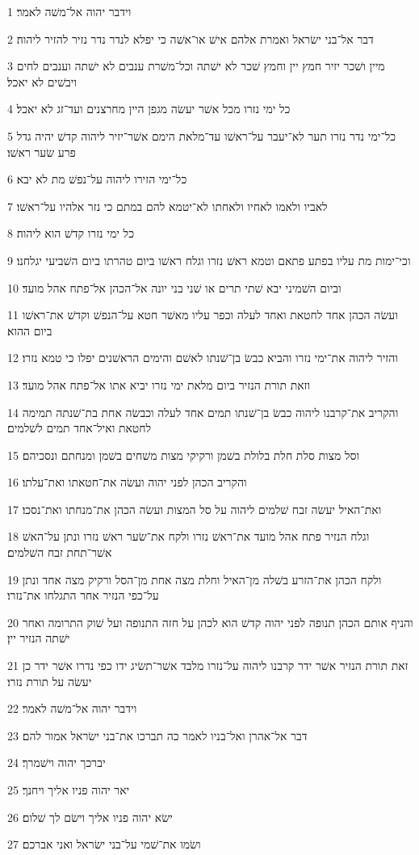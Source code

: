 \par 1 וידבר יהוה אל־משׁה לאמר׃
\par 2 דבר אל־בני ישׂראל ואמרת אלהם אישׁ או־אשׁה כי יפלא לנדר נדר נזיר להזיר ליהוה׃
\par 3 מיין ושׁכר יזיר חמץ יין וחמץ שׁכר לא ישׁתה וכל־משׁרת ענבים לא ישׁתה וענבים לחים ויבשׁים לא יאכל׃
\par 4 כל ימי נזרו מכל אשׁר יעשׂה מגפן היין מחרצנים ועד־זג לא יאכל׃
\par 5 כל־ימי נדר נזרו תער לא־יעבר על־ראשׁו עד־מלאת הימם אשׁר־יזיר ליהוה קדשׁ יהיה גדל פרע שׂער ראשׁו׃
\par 6 כל־ימי הזירו ליהוה על־נפשׁ מת לא יבא׃
\par 7 לאביו ולאמו לאחיו ולאחתו לא־יטמא להם במתם כי נזר אלהיו על־ראשׁו׃
\par 8 כל ימי נזרו קדשׁ הוא ליהוה׃
\par 9 וכי־ימות מת עליו בפתע פתאם וטמא ראשׁ נזרו וגלח ראשׁו ביום טהרתו ביום השׁביעי יגלחנו׃
\par 10 וביום השׁמיני יבא שׁתי תרים או שׁני בני יונה אל־הכהן אל־פתח אהל מועד׃
\par 11 ועשׂה הכהן אחד לחטאת ואחד לעלה וכפר עליו מאשׁר חטא על־הנפשׁ וקדשׁ את־ראשׁו ביום ההוא׃
\par 12 והזיר ליהוה את־ימי נזרו והביא כבשׂ בן־שׁנתו לאשׁם והימים הראשׁנים יפלו כי טמא נזרו׃
\par 13 וזאת תורת הנזיר ביום מלאת ימי נזרו יביא אתו אל־פתח אהל מועד׃
\par 14 והקריב את־קרבנו ליהוה כבשׂ בן־שׁנתו תמים אחד לעלה וכבשׂה אחת בת־שׁנתה תמימה לחטאת ואיל־אחד תמים לשׁלמים׃
\par 15 וסל מצות סלת חלת בלולת בשׁמן ורקיקי מצות משׁחים בשׁמן ומנחתם ונסכיהם׃
\par 16 והקריב הכהן לפני יהוה ועשׂה את־חטאתו ואת־עלתו׃
\par 17 ואת־האיל יעשׂה זבח שׁלמים ליהוה על סל המצות ועשׂה הכהן את־מנחתו ואת־נסכו׃
\par 18 וגלח הנזיר פתח אהל מועד את־ראשׁ נזרו ולקח את־שׂער ראשׁ נזרו ונתן על־האשׁ אשׁר־תחת זבח השׁלמים׃
\par 19 ולקח הכהן את־הזרע בשׁלה מן־האיל וחלת מצה אחת מן־הסל ורקיק מצה אחד ונתן על־כפי הנזיר אחר התגלחו את־נזרו׃
\par 20 והניף אותם הכהן תנופה לפני יהוה קדשׁ הוא לכהן על חזה התנופה ועל שׁוק התרומה ואחר ישׁתה הנזיר יין׃
\par 21 זאת תורת הנזיר אשׁר ידר קרבנו ליהוה על־נזרו מלבד אשׁר־תשׂיג ידו כפי נדרו אשׁר ידר כן יעשׂה על תורת נזרו׃
\par 22 וידבר יהוה אל־משׁה לאמר׃
\par 23 דבר אל־אהרן ואל־בניו לאמר כה תברכו את־בני ישׂראל אמור להם׃
\par 24 יברכך יהוה וישׁמרך׃
\par 25 יאר יהוה פניו אליך ויחנך׃
\par 26 ישׂא יהוה פניו אליך וישׂם לך שׁלום׃
\par 27 ושׂמו את־שׁמי על־בני ישׂראל ואני אברכם׃

